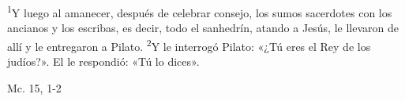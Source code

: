 \documentclass[../../rosario.tex]{subfiles}
\begin{document}
    \textsuperscript{1}Y luego al amanecer, después de celebrar consejo, los sumos sacerdotes con los ancianos y los escribas, es decir, todo el sanhedrín, atando a Jesús,
    le llevaron de allí y le entregaron a Pilato. \textsuperscript{2}Y le interrogó Pilato: «¿Tú eres el Rey de los judíos?». El le respondió: «Tú lo dices».
    \begin{flushright}
    Mc. 15, 1-2
    \end{flushright}
\end{document}
